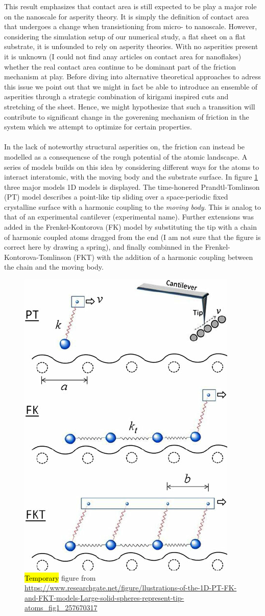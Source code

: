 This result emphasizes that contact area is still expected to be play a
major role on the nanoscale for asperity theory. It is simply the definition of contact area that undergoes a change when transistioning from micro- to
nanoscale. However, considering the simulation setup of our numerical study, a
flat sheet on a flat substrate, it is unfounded to rely on asperity theories. With no asperities present it is unknown (I could not find anay articles on contact area
for nanoflakes) whether the real contact area continue to be dominant part of the friction mechanism at play. Before diving into alternative theoretical approaches to adress this issue we point out that we might in fact be able to introduce an ensemble of asperities through a strategic combination of kirigami inspired cuts and stretching of the sheet. Hence, we might hypothesize that such a transsition will contribute to significant change in the goverening mechanism of friction in the system which we attempt to optimize for certain properties.
\\
\\
In the lack of noteworthy structural asperities on, the friction can instead be modelled as a consequencse of the rough potential of the atomic landscape. A series of models builds on this idea by considering different ways for the atoms to interact interatomic, with the moving body and the substrate surface. In figure \ref{fig:PT_FK_FKT} three major models 1D models is displayed. The time-honered  Prandtl-Tomlinson (PT) model describes a point-like tip sliding over a space-periodic fixed crystalline surface with a harmonic coupling to the \textit{moving body}. This is analog to that of an experimental cantilever (experimental name). Further extensions was added in the Frenkel-Kontorova (FK) model by substituting the tip with a chain of harmonic coupled atoms dragged from the end (I am not sure that the figure is correct here by drawing a spring), and finally combinned in the Frenkel-Kontorova-Tomlinson (FKT) with the addition of a harmonic coupling between the chain and the moving body.

\begin{figure}[H]
  \centering
  \includegraphics[width=0.4\linewidth]{figures/theory/PT_FK_FKT.png}
  \caption{\hl{Temporary} figure from \url{https://www.researchgate.net/figure/llustrations-of-the-1D-PT-FK-and-FKT-models-Large-solid-spheres-represent-tip-atoms_fig1_257670317}}
  \label{fig:PT_FK_FKT}
\end{figure}



